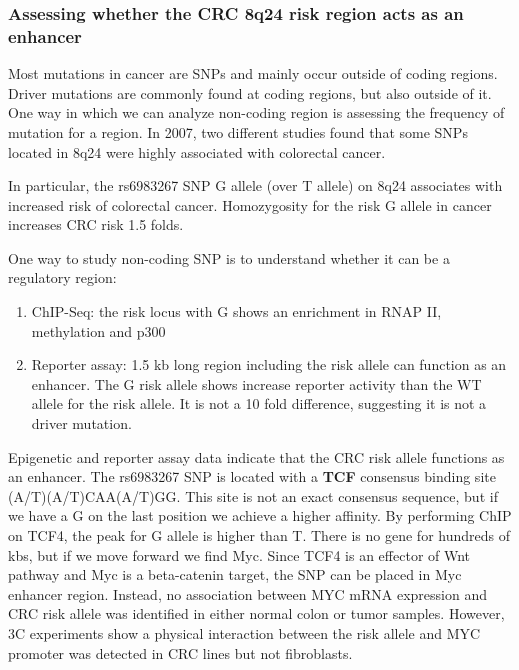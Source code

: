 \hypertarget{assessing-whether-the-crc-8q24-risk-region-acts-as-an-enhancer}{%
\subsubsection{\texorpdfstring{\textbf{Assessing whether the CRC 8q24 risk region acts as an enhancer}}{Assessing whether the CRC 8q24 risk region acts as an enhancer}}\label{assessing-whether-the-crc-8q24-risk-region-acts-as-an-enhancer}}

Most mutations in cancer are SNPs and mainly occur outside of coding regions. Driver mutations are commonly found at coding regions, but also outside of it. One way in which we can analyze non-coding region is assessing the frequency of mutation for a region. In 2007, two different studies found that some SNPs located in 8q24 were highly associated with colorectal cancer.

In particular, the rs6983267 SNP G allele (over T allele) on 8q24 associates with increased risk of colorectal cancer. Homozygosity for the risk G allele in cancer increases CRC risk 1.5 folds.

One way to study non-coding SNP is to understand whether it can be a regulatory region:

\begin{enumerate}
\def\labelenumi{\arabic{enumi}.}
\tightlist
\item
  ChIP-Seq: the risk locus with G shows an enrichment in RNAP II, methylation and p300
\item
  Reporter assay: 1.5 kb long region including the risk allele can function as an enhancer. The G risk allele shows increase reporter activity than the WT allele for the risk allele. It is not a 10 fold difference, suggesting it is not a driver mutation.
\end{enumerate}

Epigenetic and reporter assay data indicate that the CRC risk allele functions as an enhancer.
The rs6983267 SNP is located with a \textbf{TCF} consensus binding site (A/T)(A/T)CAA(A/T)GG. This site is not an exact consensus sequence, but if we have a G on the last position we achieve a higher affinity. By performing ChIP on TCF4, the peak for G allele is higher than T. There is no gene for hundreds of kbs, but if we move forward we find Myc. Since TCF4 is an effector of Wnt pathway and Myc is a beta-catenin target, the SNP can be placed in Myc enhancer region. Instead, no association between MYC mRNA expression and CRC risk allele was identified in either normal colon or tumor samples. However, 3C experiments show a physical interaction between the risk allele and MYC promoter was detected in CRC lines but not fibroblasts.

